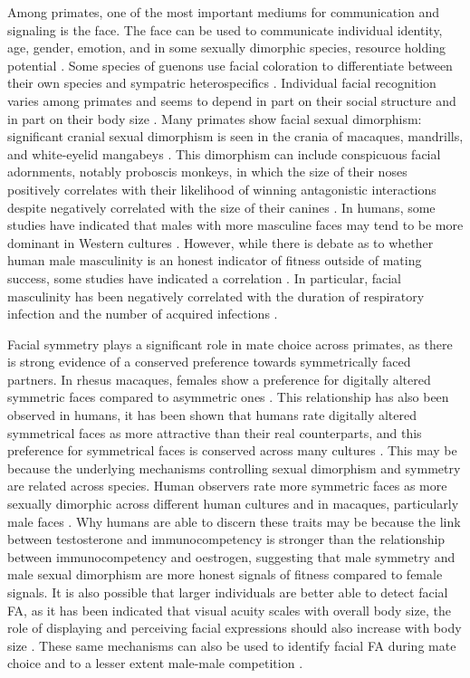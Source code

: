 Among primates, one of the most important mediums for communication and signaling is the face. The face can be used to communicate individual identity, age, gender, emotion, and in some sexually dimorphic species, resource holding potential \citep{Setchell.2001}. Some species of guenons use facial coloration to differentiate between their own species and sympatric heterospecifics \citep{Caro.2005}. Individual facial recognition varies among primates and seems to depend in part on their social structure and in part on their body size \citep{Parr.2011}.  Many primates show facial sexual dimorphism: significant cranial sexual dimorphism is seen in the crania of macaques, mandrills, and white-eyelid mangabeys \citep{O'Higgins.2002}. This dimorphism can include conspicuous facial adornments, notably proboscis monkeys, in which the size of their noses positively correlates with their likelihood of winning antagonistic interactions despite negatively correlated with the size of their canines \citep{Matsuda.2020g6t}. In humans, some studies have indicated that males with more masculine faces may tend to be more dominant in Western cultures \citep{Swaddle.2002}. However, while there is debate as to whether human male masculinity is an honest indicator of fitness outside of mating success, some studies have indicated a correlation \citep{Fink.2007, Dongen.2014}. In particular, facial masculinity has been negatively correlated with the duration of respiratory infection and the number of acquired infections \citep{Dongen.2011}. 

Facial symmetry plays a significant role in mate choice across primates, as there is strong evidence of a conserved preference towards symmetrically faced partners. In rhesus macaques, females show a preference for digitally altered symmetric faces compared to asymmetric ones \citep{Waitt.2006}. This relationship has also been observed in humans, it has been shown that humans rate digitally altered symmetrical faces as more attractive than their real counterparts, and this preference for symmetrical faces is conserved across many cultures \citep{Perrett.1999,Little.2007,Little.2008}. 
This may be because the underlying mechanisms controlling sexual dimorphism and symmetry are related across species.  Human observers rate more symmetric faces as more sexually dimorphic across different human cultures and in macaques, particularly male faces \citep{Little.2008}. Why humans are able to discern these traits may be because the link between testosterone and immunocompetency is stronger than the relationship between immunocompetency and oestrogen, suggesting that male symmetry and male sexual dimorphism are more honest signals of fitness compared to female signals. It is also possible that larger individuals are better able to detect facial FA, as it has been indicated that visual acuity scales with overall body size, the role of displaying and perceiving facial expressions should also increase with body size \citep{Kirschfeld.1976, Kiltie.2000lb}. These same mechanisms can also be used to identify facial FA during mate choice and to a lesser extent male-male competition \citep{Møller.1993}.

